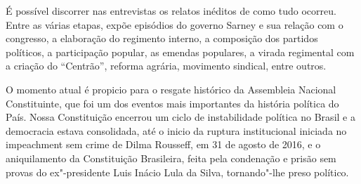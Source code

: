 É possível discorrer nas entrevistas os relatos inéditos de como tudo ocorreu. Entre as várias etapas, expõe episódios do governo Sarney e sua relação com o congresso, a elaboração do regimento interno, a composição dos partidos políticos, a participação popular, as emendas populares, a virada regimental com a criação do “Centrão”, reforma agrária, movimento sindical, entre outros.

O momento atual é propicio para o resgate histórico da Assembleia Nacional Constituinte, que foi um dos eventos mais importantes da história política do País. Nossa Constituição encerrou um ciclo de instabilidade política no Brasil e a democracia estava consolidada, até o inicio da ruptura institucional iniciada no impeachment sem crime de Dilma Rousseff, em 31 de agosto de 2016, e o aniquilamento da Constituição Brasileira, feita pela condenação e prisão sem provas do ex"-presidente Luis Inácio Lula da Silva, tornando"-lhe preso político.